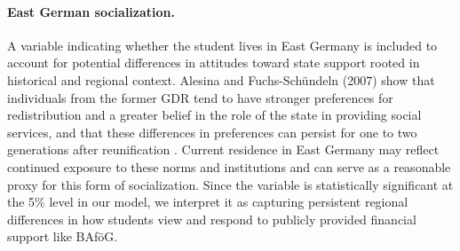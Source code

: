 \paragraph{East German socialization.}  A variable indicating whether the student lives in East Germany is included to account for potential differences in attitudes toward state support rooted in historical and regional context. Alesina and Fuchs-Schündeln (2007) show that individuals from the former GDR tend to have stronger preferences for redistribution and a greater belief in the role of the state in providing social services, and that these differences in preferences can persist for one to two generations after reunification \citep{alesina_good-bye_2007}. Current residence in East Germany may reflect continued exposure to these norms and institutions and can serve as a reasonable proxy for this form of socialization. Since the variable is statistically significant at the 5\% level in our model, we interpret it as capturing persistent regional differences in how students view and respond to publicly provided financial support like BAföG.





